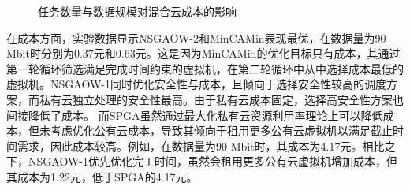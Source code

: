 \begin{figure}[htb]
    \caption{任务数量与数据规模对混合云成本的影响}\label{fig:task_amount_vs_cost}
\end{figure}

在成本方面，实验数据显示NSGAOW-2和MinCAMin表现最优，在数据量为90 Mbit时分别为0.37元和0.63元。这是因为MinCAMin的优化目标只有成本，其通过第一轮循环筛选满足完成时间约束的虚拟机，在第二轮循环中从中选择成本最低的虚拟机。NSGAOW-1同时优化安全性与成本，且倾向于选择安全性较高的调度方案，而私有云独立处理的安全性最高。由于私有云成本固定，选择高安全性方案也间接降低了成本。
而SPGA虽然通过最大化私有云资源利用率理论上可以降低成本，但未考虑优化公有云成本，导致其倾向于租用更多公有云虚拟机以满足截止时间需求，因此成本较高。例如，在数据量为90 Mbit时，其成本为4.17元。相比之下，NSGAOW-1优先优化完工时间，虽然会租用更多公有云虚拟机增加成本，但其成本为1.22元，低于SPGA的4.17元。

